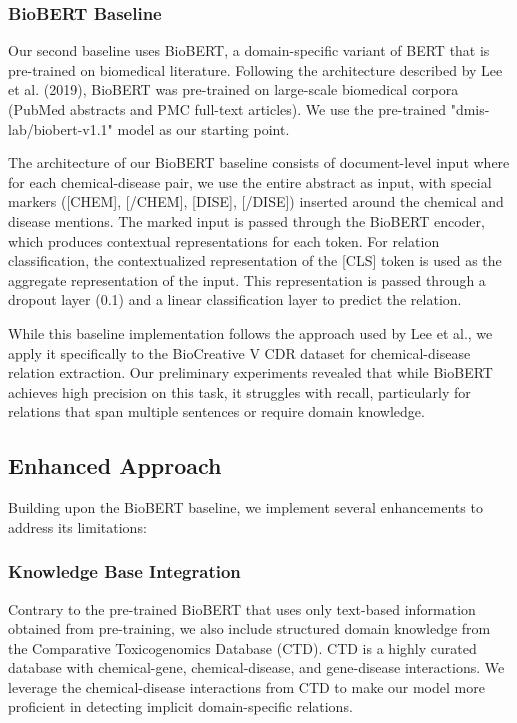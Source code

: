 \documentclass{amia}
\begin{document}
\subsubsection*{BioBERT Baseline}
Our second baseline uses BioBERT, a domain-specific variant of BERT that is pre-trained on biomedical literature. Following the architecture described by Lee et al. (2019), BioBERT was pre-trained on large-scale biomedical corpora (PubMed abstracts and PMC full-text articles). We use the pre-trained "dmis-lab/biobert-v1.1" model as our starting point.

The architecture of our BioBERT baseline consists of document-level input where for each chemical-disease pair, we use the entire abstract as input, with special markers ([CHEM], [/CHEM], [DISE], [/DISE]) inserted around the chemical and disease mentions. The marked input is passed through the BioBERT encoder, which produces contextual representations for each token. For relation classification, the contextualized representation of the [CLS] token is used as the aggregate representation of the input. This representation is passed through a dropout layer (0.1) and a linear classification layer to predict the relation.

While this baseline implementation follows the approach used by Lee et al., we apply it specifically to the BioCreative V CDR dataset for chemical-disease relation extraction. Our preliminary experiments revealed that while BioBERT achieves high precision on this task, it struggles with recall, particularly for relations that span multiple sentences or require domain knowledge.

\subsection*{Enhanced Approach}

Building upon the BioBERT baseline, we implement several enhancements to address its limitations:

\subsubsection*{Knowledge Base Integration}
Contrary to the pre-trained BioBERT that uses only text-based information obtained from pre-training, we also include structured domain knowledge from the Comparative Toxicogenomics Database (CTD). CTD is a highly curated database with chemical-gene, chemical-disease, and gene-disease interactions. We leverage the chemical-disease interactions from CTD to make our model more proficient in detecting implicit domain-specific relations.
\end{document}
